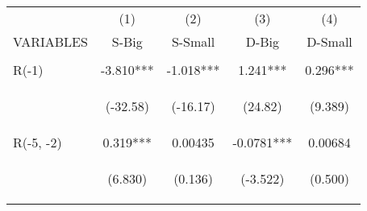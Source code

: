 \documentclass[]{article}
\begin{document}
\begin{center}
    \begin{tabular}{lcccc} \hline
                         & (1)                                             & (2)                                            & (3)                                            & (4)                                            \\
        VARIABLES        & S-Big                                           & S-Small                                        & D-Big                                          & D-Small                                        \\ \hline
        \vspace{4pt}     & \begin{footnotesize}\end{footnotesize}          & \begin{footnotesize}\end{footnotesize}         & \begin{footnotesize}\end{footnotesize}         & \begin{footnotesize}\end{footnotesize}         \\
        R(-1)            & -3.810***                                       & -1.018***                                      & 1.241***                                       & 0.296***                                       \\
        \vspace{4pt}     & \begin{footnotesize}(-32.58)\end{footnotesize}  & \begin{footnotesize}(-16.17)\end{footnotesize} & \begin{footnotesize}(24.82)\end{footnotesize}  & \begin{footnotesize}(9.389)\end{footnotesize}  \\
        R(-5, -2)        & 0.319***                                        & 0.00435                                        & -0.0781***                                     & 0.00684                                        \\
        \vspace{4pt}     & \begin{footnotesize}(6.830)\end{footnotesize}   & \begin{footnotesize}(0.136)\end{footnotesize}  & \begin{footnotesize}(-3.522)\end{footnotesize} & \begin{footnotesize}(0.500)\end{footnotesize}  \\

\end{tabular}
\end{center}
\end{document}
